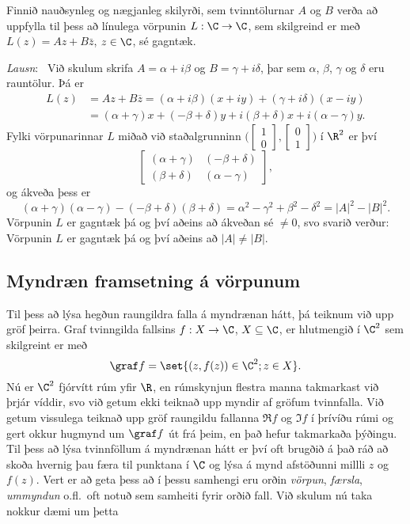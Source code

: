 \begin{sy}  Finnið nauðsynleg og nægjanleg skilyrði, sem tvinntölurnar
$A$ og $B$ verða að uppfylla til þess að línulega vörpunin
$L:\C\to\C$,  sem skilgreind er með $L(z)=Az+B\bar z$, $z\in \C$,
sé gagntæk.  

\smallskip\noindent
{\it Lausn}: \ 
Við skulum skrifa $A={\alpha}+i{\beta}$ og
$B={\gamma}+i{\delta}$, þar sem ${\alpha}$, ${\beta}$, ${\gamma}$ og
${\delta}$ eru rauntölur.  Þá er
\begin{align*}
L(z)&=Az+B\overline z= ({\alpha}+i{\beta})(x+iy)+({\gamma}+i{\delta})(x-iy)\\
&=({\alpha}+{\gamma})x+(-{\beta}+{\delta})y+
i({\beta}+{\delta})x+i({\alpha}-{\gamma})y.
\end{align*}
Fylki vörpunarinnar $L$ miðað við staðalgrunninn
$\big(\left[\begin{matrix}1 \\ 0\end{matrix}\right],
\left[\begin{matrix}0 \\ 1\end{matrix}\right]\big)$ í
$\R^2$ er því
$$
\left[\begin{matrix} ({\alpha}+{\gamma}) & (-{\beta}+{\delta})\\
({\beta}+{\delta}) & ({\alpha}-{\gamma})\end{matrix}\right],
$$
og ákveða þess er 
$$
({\alpha}+{\gamma})({\alpha}-{\gamma})
      -(-{\beta}+{\delta})({\beta}+{\delta})
={\alpha}^2-{\gamma}^2+{\beta}^2-{\delta}^2=|A|^2-|B|^2.
$$
Vörpunin $L$ er gagntæk þá og því aðeins að ákveðan sé $\neq 0$, svo svarið
verður:  Vörpunin  $L$ er gagntæk þá og því aðeins að  $|A|\neq |B|$.
\end{sy}

\subsection*{Myndræn framsetning á vörpunum}

Til þess að lýsa hegðun raungildra falla á myndrænan hátt, þá teiknum
við upp gröf þeirra.  Graf tvinngilda fallsins $f:X\to \C$, 
$X\subseteq \C$, er hlutmengið í $\C^2$ sem skilgreint er með
$$
\graf f=\set{(z,f(z))\in \C^2; z\in X}.
$$
Nú er $\C^2$ fjórvítt rúm yfir $\R$, en rúmskynjun flestra manna
takmarkast við þrjár víddir, svo við getum ekki teiknað upp myndir  af
gröfum tvinnfalla.  Við getum vissulega teiknað upp gröf raungildu
fallanna $\Re f$ og $\Im f$ í þrívíðu rúmi og gert okkur hugmynd 
um $\graf f$ út frá þeim, en það hefur takmarkaða þýðingu.  
Til þess að lýsa tvinnföllum á myndrænan hátt er því oft brugðið á það
ráð að skoða hvernig þau færa til punktana í $\C$ og lýsa á mynd
afstöðunni millli $z$ og $f(z)$. Vert er að geta þess að í þessu
samhengi eru orðin {\it vörpun}, {\it færsla}, {\it ummyndun}
o.fl.~oft notuð sem samheiti fyrir orðið fall.
Við skulum nú taka nokkur dæmi um þetta



